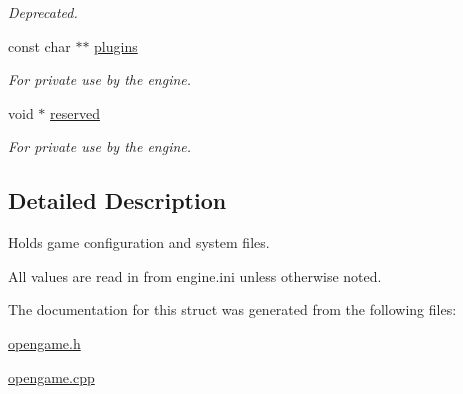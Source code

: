 \begin{DoxyCompactItemize}
\begin{DoxyCompactList}\small\item\em Deprecated. \end{DoxyCompactList}\item 
\hypertarget{structTS__Config_ae8fdcee1672685127862e230dcc16828}{const char $\ast$$\ast$ \hyperlink{structTS__Config_ae8fdcee1672685127862e230dcc16828}{plugins}}\label{structTS__Config_ae8fdcee1672685127862e230dcc16828}

\begin{DoxyCompactList}\small\item\em For private use by the engine. \end{DoxyCompactList}\item 
\hypertarget{structTS__Config_ac5e54a86add352c5030759057eb0b587}{void $\ast$ \hyperlink{structTS__Config_ac5e54a86add352c5030759057eb0b587}{reserved}}\label{structTS__Config_ac5e54a86add352c5030759057eb0b587}

\begin{DoxyCompactList}\small\item\em For private use by the engine. \end{DoxyCompactList}\end{DoxyCompactItemize}


\subsection{Detailed Description}
Holds game configuration and system files. 

All values are read in from engine.\-ini unless otherwise noted. 

The documentation for this struct was generated from the following files\-:\begin{DoxyCompactItemize}
\item 
\hyperlink{opengame_8h}{opengame.\-h}\item 
\hyperlink{opengame_8cpp}{opengame.\-cpp}\end{DoxyCompactItemize}
